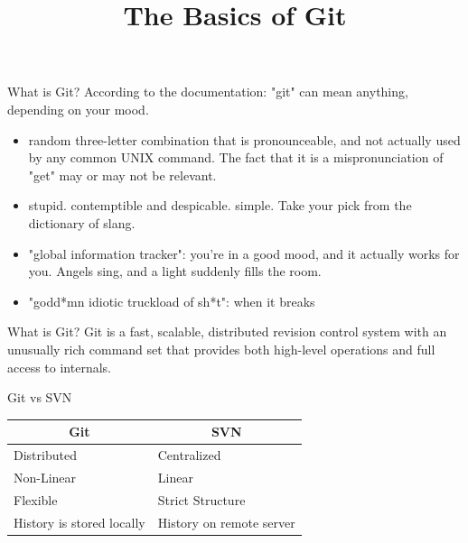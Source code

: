 \documentclass[14pt]{beamer}
\title{The Basics of Git}
\begin{document}
\begin{frame}
\titlepage
\end{frame}

\begin{frame}{What is Git?}
	According to the documentation:\newline
	"git" can mean anything, depending on your mood.
	\begin{itemize}
		\small
		\item random three-letter combination that is pronounceable, and not
		   actually used by any common UNIX command.  The fact that it is a
		   mispronunciation of "get" may or may not be relevant.
		\item stupid. contemptible and despicable. simple. Take your pick from the
		   dictionary of slang.
		\item "global information tracker": you're in a good mood, and it actually
		   works for you. Angels sing, and a light suddenly fills the room.
		\item "godd*mn idiotic truckload of sh*t": when it breaks
	\end{itemize}
\end{frame}

\begin{frame}{What is Git?}
	Git is a fast, scalable, distributed revision control system with an
	unusually rich command set that provides both high-level operations
	and full access to internals.
\end{frame}

\begin{frame}{Git vs SVN}
	\begin{table}[position specifier]
		\centering
		\begin{tabular}{|l|l|}
			\hline
			\multicolumn{1}{|c|}{Git} & \multicolumn{1}{|c|}{SVN} \\ \hline
			Distributed & Centralized \\ \hline
			Non-Linear & Linear \\ \hline
			Flexible & Strict Structure \\ \hline
			History is stored locally & History on remote server \\
			\hline
		\end{tabular}
	\end{table}
\end{frame}
\end{document}
